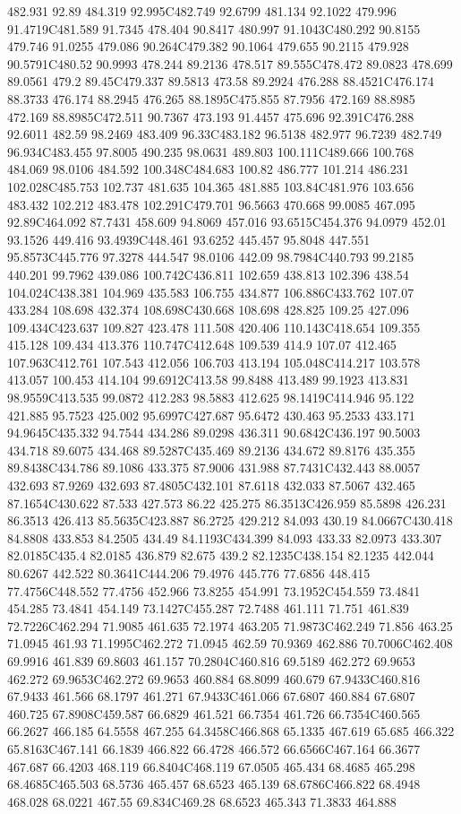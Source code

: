 482.931 92.89 484.319 92.995C482.749 92.6799 481.134 92.1022 479.996 91.4719C481.589 91.7345 478.404 90.8417 480.997 91.1043C480.292 90.8155 479.746 91.0255 479.086 90.264C479.382 90.1064 479.655 90.2115 479.928 90.5791C480.52 90.9993 478.244 89.2136 478.517 89.555C478.472 89.0823 478.699 89.0561 479.2 89.45C479.337 89.5813 473.58 89.2924 476.288 88.4521C476.174 88.3733 476.174 88.2945 476.265 88.1895C475.855 87.7956 472.169 88.8985 472.169 88.8985C472.511 90.7367 473.193 91.4457 475.696 92.391C476.288 92.6011 482.59 98.2469 483.409 96.33C483.182 96.5138 482.977 96.7239 482.749 96.934C483.455 97.8005 490.235 98.0631 489.803 100.111C489.666 100.768 484.069 98.0106 484.592 100.348C484.683 100.82 486.777 101.214 486.231 102.028C485.753 102.737 481.635 104.365 481.885 103.84C481.976 103.656 483.432 102.212 483.478 102.291C479.701 96.5663 470.668 99.0085 467.095 92.89C464.092 87.7431 458.609 94.8069 457.016 93.6515C454.376 94.0979 452.01 93.1526 449.416 93.4939C448.461 93.6252 445.457 95.8048 447.551 95.8573C445.776 97.3278 444.547 98.0106 442.09 98.7984C440.793 99.2185 440.201 99.7962 439.086 100.742C436.811 102.659 438.813 102.396 438.54 104.024C438.381 104.969 435.583 106.755 434.877 106.886C433.762 107.07 433.284 108.698 432.374 108.698C430.668 108.698 428.825 109.25 427.096 109.434C423.637 109.827 423.478 111.508 420.406 110.143C418.654 109.355 415.128 109.434 413.376 110.747C412.648 109.539 414.9 107.07 412.465 107.963C412.761 107.543 412.056 106.703 413.194 105.048C414.217 103.578 413.057 100.453 414.104 99.6912C413.58 99.8488 413.489 99.1923 413.831 98.9559C413.535 99.0872 412.283 98.5883 412.625 98.1419C414.946 95.122 421.885 95.7523 425.002 95.6997C427.687 95.6472 430.463 95.2533 433.171 94.9645C435.332 94.7544 434.286 89.0298 436.311 90.6842C436.197 90.5003 434.718 89.6075 434.468 89.5287C435.469 89.2136 434.672 89.8176 435.355 89.8438C434.786 89.1086 433.375 87.9006 431.988 87.7431C432.443 88.0057 432.693 87.9269 432.693 87.4805C432.101 87.6118 432.033 87.5067 432.465 87.1654C430.622 87.533 427.573 86.22 425.275 86.3513C426.959 85.5898 426.231 86.3513 426.413 85.5635C423.887 86.2725 429.212 84.093 430.19 84.0667C430.418 84.8808 433.853 84.2505 434.49 84.1193C434.399 84.093 433.33 82.0973 433.307 82.0185C435.4 82.0185 436.879 82.675 439.2 82.1235C438.154 82.1235 442.044 80.6267 442.522 80.3641C444.206 79.4976 445.776 77.6856 448.415 77.4756C448.552 77.4756 452.966 73.8255 454.991 73.1952C454.559 73.4841 454.285 73.4841 454.149 73.1427C455.287 72.7488 461.111 71.751 461.839 72.7226C462.294 71.9085 461.635 72.1974 463.205 71.9873C462.249 71.856 463.25 71.0945 461.93 71.1995C462.272 71.0945 462.59 70.9369 462.886 70.7006C462.408 69.9916 461.839 69.8603 461.157 70.2804C460.816 69.5189 462.272 69.9653 462.272 69.9653C462.272 69.9653 460.884 68.8099 460.679 67.9433C460.816 67.9433 461.566 68.1797 461.271 67.9433C461.066 67.6807 460.884 67.6807 460.725 67.8908C459.587 66.6829 461.521 66.7354 461.726 66.7354C460.565 66.2627 466.185 64.5558 467.255 64.3458C466.868 65.1335 467.619 65.685 466.322 65.8163C467.141 66.1839 466.822 66.4728 466.572 66.6566C467.164 66.3677 467.687 66.4203 468.119 66.8404C468.119 67.0505 465.434 68.4685 465.298 68.4685C465.503 68.5736 465.457 68.6523 465.139 68.6786C466.822 68.4948 468.028 68.0221 467.55 69.834C469.28 68.6523 465.343 71.3833 464.888 